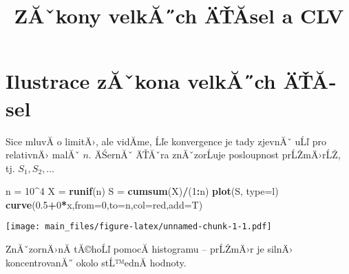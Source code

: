 \documentclass[
]{article}
\title{ZĂˇkony velkĂ˝ch ÄŤĂ­sel a CLV}
\author{}
\date{\vspace{-2.5em}}
\newenvironment{Shaded}{\begin{snugshade}}{\end{snugshade}}
\newcommand{\AttributeTok}[1]{\textcolor[rgb]{0.13,0.29,0.53}{#1}}
\newcommand{\DecValTok}[1]{\textcolor[rgb]{0.00,0.00,0.81}{#1}}
\newcommand{\FloatTok}[1]{\textcolor[rgb]{0.00,0.00,0.81}{#1}}
\newcommand{\FunctionTok}[1]{\textcolor[rgb]{0.13,0.29,0.53}{\textbf{#1}}}
\newcommand{\NormalTok}[1]{#1}
\newcommand{\OtherTok}[1]{\textcolor[rgb]{0.56,0.35,0.01}{#1}}
\newcommand{\SpecialCharTok}[1]{\textcolor[rgb]{0.81,0.36,0.00}{\textbf{#1}}}
\newcommand{\StringTok}[1]{\textcolor[rgb]{0.31,0.60,0.02}{#1}}
\begin{document}
\maketitle

\hypertarget{ilustrace-zux103ux2c7kona-velkux103ch-uxe4ux165ux103sel}{%
\section{Ilustrace zĂˇkona velkĂ˝ch
ÄŤĂ­sel}\label{ilustrace-zux103ux2c7kona-velkux103ch-uxe4ux165ux103sel}}

Sice mluvĂ­ o limitÄ›, ale vidĂ­me, Ĺľe konvergence je tady zjevnĂˇ uĹľ
pro relativnÄ› malĂˇ \(n\). ÄŚernĂˇ ÄŤĂˇra znĂˇzorĹuje posloupnost
prĹŻmÄ›rĹŻ, tj. \(S_1, S_2, \dots\)

\begin{Shaded}
\begin{Highlighting}[]
\NormalTok{n }\OtherTok{=} \DecValTok{10}\SpecialCharTok{\^{}}\DecValTok{4}
\NormalTok{X }\OtherTok{=} \FunctionTok{runif}\NormalTok{(n)}
\NormalTok{S }\OtherTok{=} \FunctionTok{cumsum}\NormalTok{(X)}\SpecialCharTok{/}\NormalTok{(}\DecValTok{1}\SpecialCharTok{:}\NormalTok{n)}
\FunctionTok{plot}\NormalTok{(S, }\AttributeTok{type=}\StringTok{\textquotesingle{}l\textquotesingle{}}\NormalTok{)}
\FunctionTok{curve}\NormalTok{(}\FloatTok{0.5}\SpecialCharTok{+}\DecValTok{0}\SpecialCharTok{*}\NormalTok{x,}\AttributeTok{from=}\DecValTok{0}\NormalTok{,}\AttributeTok{to=}\NormalTok{n,}\AttributeTok{col=}\StringTok{\textquotesingle{}red\textquotesingle{}}\NormalTok{,}\AttributeTok{add=}\NormalTok{T)}
\end{Highlighting}
\end{Shaded}

\texttt{[image: main\_files/figure-latex/unnamed-chunk-1-1.pdf]}

ZnĂˇzornÄ›nĂ­ tĂ©hoĹľ pomocĂ­ histogramu -- prĹŻmÄ›r je silnÄ›
koncentrovanĂ˝ okolo stĹ™ednĂ­ hodnoty.
\end{document}
